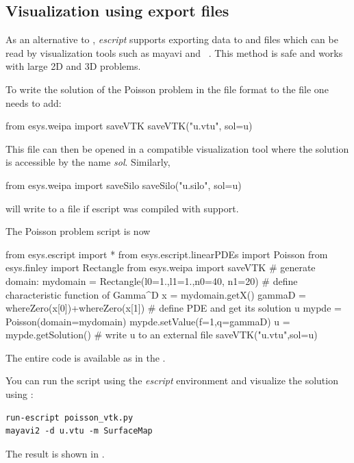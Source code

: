 \subsection{Visualization using export files}

As an alternative to \MATPLOTLIB, {\it escript} supports exporting data to
\VTK and \SILO files which can be read by visualization tools such as
mayavi\cite{mayavi} and \VisIt~\cite{VisIt}. This method is \MPI safe and
works with large 2D and 3D problems.

To write the solution  of the Poisson problem in the \VTK file format
to the file  one needs to add:
\begin{python}
  from esys.weipa import saveVTK
  saveVTK("u.vtu", sol=u)
\end{python}
This file can then be opened in a \VTK compatible visualization tool where the
solution is accessible by the name {\it sol}. Similarly,
\begin{python}
  from esys.weipa import saveSilo
  saveSilo("u.silo", sol=u)
\end{python}
will write  to a \SILO file if escript was compiled with \SILO support.

The Poisson problem script is now 
\begin{python}
  from esys.escript import *
  from esys.escript.linearPDEs import Poisson
  from esys.finley import Rectangle
  from esys.weipa import saveVTK
  # generate domain:
  mydomain = Rectangle(l0=1.,l1=1.,n0=40, n1=20)
  # define characteristic function of Gamma^D
  x = mydomain.getX()
  gammaD = whereZero(x[0])+whereZero(x[1])
  # define PDE and get its solution u
  mypde = Poisson(domain=mydomain)
  mypde.setValue(f=1,q=gammaD)
  u = mypde.getSolution()
  # write u to an external file
  saveVTK("u.vtu",sol=u)
\end{python}
The entire code is available as  in the \ExampleDirectory.

You can run the script using the {\it escript} environment and visualize the
solution using \mayavi:
\begin{verbatim}
run-escript poisson_vtk.py
mayavi2 -d u.vtu -m SurfaceMap
\end{verbatim}
The result is shown in .

